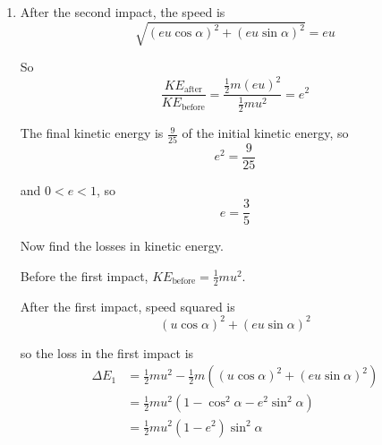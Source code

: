 \documentclass[leqno]{article}
\begin{document}
\begin{enumerate}[
  label=\textbf{\arabic*.},
  leftmargin=*,
  topsep=0pt,
  partopsep=0pt,
  parsep=0pt
]
\begin{djsSolution}
\begin{enumerate}[label=\textbf{(\alph*)}]
  Therefore
  \[
  \tan\gamma=\frac{\text{component perpendicular to }BC}{\text{component parallel to }BC}
  =\frac{eu\cos\alpha}{eu\sin\alpha}
  =\cot\alpha
  \]

  Hence
  \[
  \tan\gamma=\tan(90^\circ-\alpha)
  \]

  $\gamma$ is an acute angle, so
  \[
  \gamma=90^\circ-\alpha
  \]

  Also, the initial velocity was
  \[
  \begin{pmatrix}u\cos\alpha\\-u\sin\alpha\end{pmatrix}
  \]

  and the final velocity is
  \[
  \begin{pmatrix}-eu\cos\alpha\\eu\sin\alpha\end{pmatrix}=-e\begin{pmatrix}u\cos\alpha\\-u\sin\alpha\end{pmatrix}
  \]

  So the final velocity is a negative multiple of the initial velocity. Therefore the final direction of motion is parallel to the initial direction, but in the opposite sense.

  \item After the second impact, the speed is
  \[
  \sqrt{(eu\cos\alpha)^2+(eu\sin\alpha)^2}=eu
  \]

  So
  \[
  \frac{KE_{\text{after}}}{KE_{\text{before}}}
  =\frac{\frac12 m(eu)^2}{\frac12 mu^2}
  =e^2
  \]

  The final kinetic energy is $\frac{9}{25}$ of the initial kinetic energy, so
  \[
  e^2=\frac{9}{25}
  \]

  and $0<e<1$, so
  \[
  e=\frac35
  \]

  Now find the losses in kinetic energy.

  Before the first impact, $KE_{\text{before}}=\frac12 mu^2$.

  After the first impact, speed squared is
  \[
  (u\cos\alpha)^2+(eu\sin\alpha)^2
  \]

  so the loss in the first impact is
  \begin{align*}
  \Delta E_1
  &=\frac12 mu^2-\frac12 m\left((u\cos\alpha)^2+(eu\sin\alpha)^2\right) \\
  &=\frac12 mu^2\left(1-\cos^2\alpha-e^2\sin^2\alpha\right) \\
  &=\frac12 mu^2(1-e^2)\sin^2\alpha
  \end{align*}


\end{enumerate}
\end{djsSolution}
\end{enumerate}
\end{document}
